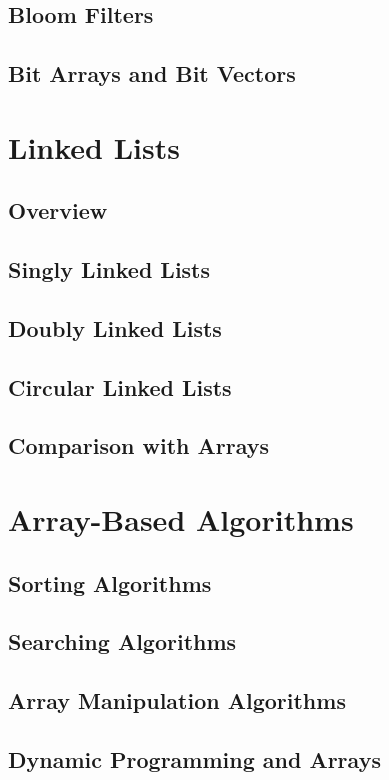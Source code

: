 \documentclass[12pt, oneside]{book}
\begin{document}
	\section{Bloom Filters}
	\section{Bit Arrays and Bit Vectors}
	
\chapter{Linked Lists}
\section{Overview}
\section{Singly Linked Lists}
\section{Doubly Linked Lists}
\section{Circular Linked Lists}
\section{Comparison with Arrays}

\chapter{Array-Based Algorithms}
\section{Sorting Algorithms}
\section{Searching Algorithms}
\section{Array Manipulation Algorithms}
\section{Dynamic Programming and Arrays}
\end{document}
